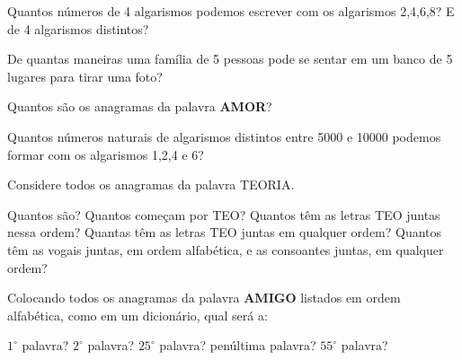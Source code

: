 \documentclass[10pt,a4paper]{article}
\begin{document}
\begin{multicols}{2}

    \begin{question}[type=exam]
        Quantos números de 4 algarismos podemos escrever com os algarismos
        2,4,6,8? E de 4 algarismos distintos?
    \end{question}

    \begin{question}[type=exam]
        De quantas maneiras uma família de 5 pessoas pode se sentar em um
        banco de 5 lugares para tirar uma foto?
      \end{question}

    \begin{question}[type=exam]
        Quantos são os anagramas da palavra \textbf{AMOR}?
    \end{question}

    \begin{question}[type=exam]
        Quantos números naturais de algarismos distintos entre 5000 e 10000
        podemos formar com os algarismos 1,2,4 e 6?
      \end{question}

    \begin{question}[type=exam]
        Considere todos os anagramas da palavra TEORIA.
        \begin{tasks}
            \task Quantos são?
            \task Quantos começam por TEO?
            \task Quantos têm as letras TEO juntas nessa ordem?
            \task Quantas têm as letras TEO juntas em qualquer ordem?
            \task Quantos têm as vogais juntas, em ordem alfabética, e as
            consoantes juntas, em qualquer ordem?
        \end{tasks}
    \end{question}

    \begin{question}[type=exam]
        Colocando todos os anagramas da palavra \textbf{AMIGO} listados em
        ordem alfabética, como em um dicionário, qual será a:
        \begin{tasks}
        \task $1^\circ$ palavra?
        \task $2^\circ$ palavra?
        \task $25^\circ$ palavra?
        \task penúltima palavra?
        \task $55^\circ$ palavra?
        \end{tasks}
    \end{question}

		\clearpage
	\end{multicols}

\end{document}
